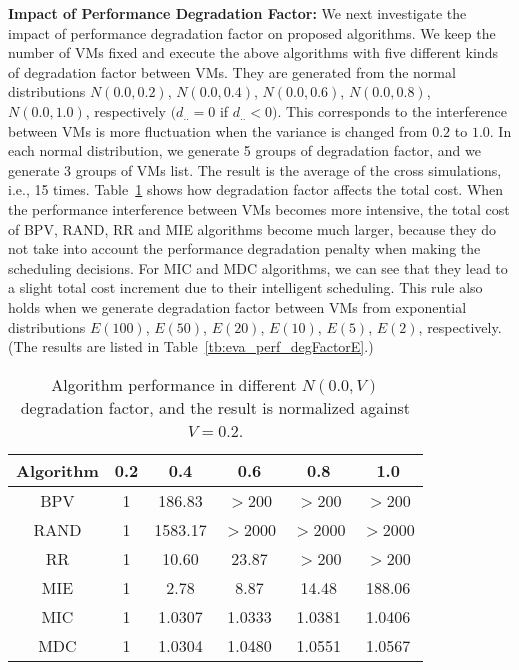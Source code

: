 \documentclass[10pt,journal]{IEEEtran}
\begin{document}
\textbf{Impact of Performance Degradation Factor:} We next investigate the impact of performance degradation factor on proposed algorithms. We keep the number of VMs fixed and execute the above algorithms with five different kinds of degradation factor between VMs. They are generated from the normal distributions $N(0.0,0.2)$, $N(0.0,0.4)$, $N(0.0,0.6)$, $N(0.0,0.8)$, $N(0.0,1.0)$, respectively $(d_{..}=0$ if $d_{..}<0)$. This corresponds to the interference between VMs is more fluctuation when the variance is changed from $0.2$ to $1.0$. In each normal distribution, we generate 5 groups of degradation factor, and we generate 3 groups of VMs list. The result is the average of the cross simulations, i.e., 15 times. Table~\ref{tb:eva_perf_degFactorN} shows how degradation factor affects the total cost. When the performance interference between VMs becomes more intensive, the total cost of BPV, RAND, RR and MIE algorithms become much larger, because they do not take into account the performance degradation penalty when making the scheduling decisions. For MIC and MDC algorithms, we can see that they lead to a slight total cost increment due to their intelligent scheduling. This rule also holds when we generate degradation factor between VMs from exponential distributions $E(100)$, $E(50)$, $E(20)$, $E(10)$, $E(5)$, $E(2)$, respectively. (The results are listed in Table~\ref{tb:eva_perf_degFactorE}.)
\begin{table}[htbp]
\centering
\caption{\label{tb:eva_perf_degFactorN}Algorithm performance in different $N(0.0, V)$ degradation factor, and the result is normalized against $V=0.2$.}
\begin{tabular}{c|c|c|c|c|c}\hline\hline
Algorithm&0.2&0.4&0.6&0.8&1.0\\\hline
BPV&1&186.83&${>}$200&${>}$200&${>}$200\\
RAND&1&1583.17&${>}$2000&${>}$2000&${>}$2000\\
RR&1&10.60&23.87&${>}$200&${>}$200\\
MIE&1&2.78&8.87&14.48&188.06\\\hline
MIC&1&1.0307&1.0333&1.0381&1.0406\\
MDC&1&1.0304&1.0480&1.0551&1.0567\\\hline\hline
\end{tabular}
\end{table}
\end{document}
